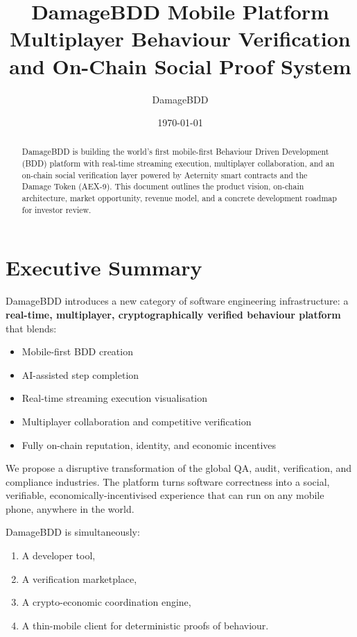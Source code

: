 \documentclass[12pt,a4paper]{article}
\title{\bfseries\LARGE DamageBDD Mobile Platform \\[4pt]
\Large Multiplayer Behaviour Verification \\[4pt]
and On-Chain Social Proof System}
\author{DamageBDD}
\date{\today}
\begin{document}
\maketitle

\begin{abstract}
DamageBDD is building the world’s first mobile-first Behaviour Driven Development (BDD) platform with real-time streaming execution, multiplayer collaboration, and an on-chain social verification layer powered by Aeternity smart contracts and the Damage Token (AEX-9). This document outlines the product vision, on-chain architecture, market opportunity, revenue model, and a concrete development roadmap for investor review.
\end{abstract}

\newpage

\tableofcontents
\newpage

\section{Executive Summary}

DamageBDD introduces a new category of software engineering infrastructure:
a \textbf{real-time, multiplayer, cryptographically verified behaviour platform}
that blends:

\begin{itemize}[leftmargin=1.3cm]
    \item Mobile-first BDD creation
    \item AI-assisted step completion
    \item Real-time streaming execution visualisation
    \item Multiplayer collaboration and competitive verification
    \item Fully on-chain reputation, identity, and economic incentives
\end{itemize}

We propose a disruptive transformation of the global QA, audit, verification, and compliance industries. The platform turns software correctness into a social, verifiable, economically-incentivised experience that can run on any mobile phone, anywhere in the world.

DamageBDD is simultaneously:

\begin{enumerate}
    \item A developer tool,
    \item A verification marketplace,
    \item A crypto-economic coordination engine,
    \item A thin-mobile client for deterministic proofs of behaviour.
\end{enumerate}
\end{document}
